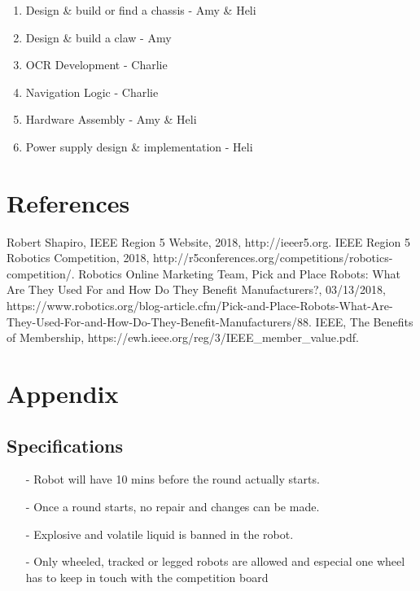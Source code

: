 \documentclass[12pt]{article}
\begin{document}
\begin{enumerate}[noitemsep]
	\item Design \& build or find a chassis - Amy \& Heli
	\item Design \& build a claw - Amy
	\item OCR Development - Charlie
	\item Navigation Logic - Charlie
	\item Hardware Assembly - Amy \& Heli
	\item Power supply design \& implementation - Heli
\end{enumerate}

\section{References}
\begin{thebibliography}{4}
	Robert Shapiro, IEEE Region 5 Website, 2018, http://ieeer5.org.
	IEEE Region 5 Robotics Competition, 2018, http://r5conferences.org/competitions/robotics-competition/.
	Robotics Online Marketing Team, Pick and Place Robots: What Are They Used For and How Do They Benefit Manufacturers?, 03/13/2018, https://www.robotics.org/blog-article.cfm/Pick-and-Place-Robots-What-Are-They-Used-For-and-How-Do-They-Benefit-Manufacturers/88.
	IEEE, The Benefits of Membership, https://ewh.ieee.org/reg/3/IEEE\_member\_value.pdf.
	
\end{thebibliography}

\section{Appendix}

\subsection{Specifications}

\begin{itemize}[noitemsep]
	\item[-] Robot will have 10 mins before the round actually starts.
	\item[-] Once a round starts, no repair and changes can be made. 
	\item[-] Explosive and volatile liquid is banned in the robot.
	\item[-] Only wheeled, tracked or legged robots are allowed and especial one wheel has to keep in touch with the competition board
\end{itemize}
\end{document}
